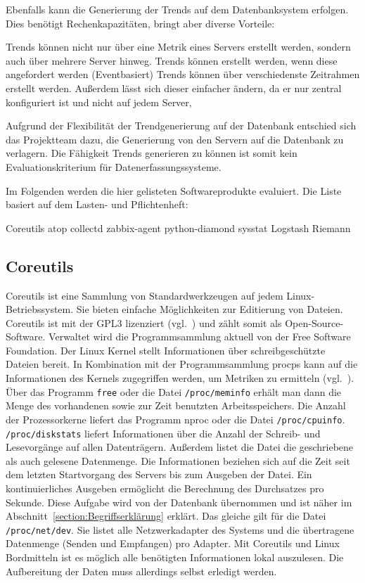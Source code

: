 Ebenfalls kann die Generierung der Trends auf dem Datenbanksystem erfolgen.
Dies benötigt Rechenkapazitäten, bringt aber diverse Vorteile:

\begin{outline}
  \1 Trends können nicht nur über eine Metrik eines Servers erstellt werden,
  sondern auch über mehrere Server hinweg.
  \1 Trends können erstellt werden, wenn diese angefordert werden
  (Eventbasiert)
  \1 Trends können über verschiedenste Zeitrahmen erstellt werden. Außerdem
  lässt sich dieser einfacher ändern, da er nur zentral konfiguriert ist und
  nicht auf jedem Server,
\end{outline}

Aufgrund der Flexibilität der Trendgenerierung auf der Datenbank entschied sich
das Projektteam dazu, die Generierung von den Servern auf die Datenbank zu
verlagern. Die Fähigkeit Trends generieren zu können ist somit kein
Evaluationskriterium für Datenerfassungssysteme.

Im Folgenden werden die hier gelisteten Softwareprodukte evaluiert. Die Liste
basiert auf dem Lasten- und Pflichtenheft:

\begin{outline}
  \1 Coreutils
  \1 atop
  \1 collectd
  \1 zabbix-agent
  \1 python-diamond
  \1 sysstat
  \1 Logstash
  \1 Riemann
\end{outline}
\tm%

\subsection{Coreutils}
Coreutils ist eine Sammlung von Standardwerkzeugen auf jedem
Linux-Betriebssystem. Sie bieten einfache Möglichkeiten zur Editierung von
Dateien. Coreutils ist mit der GPL3 lizenziert (vgl.~\cite{coreutils}) und
zählt somit als Open-Source-Software. Verwaltet wird die Programmsammlung
aktuell von der Free Software Foundation. Der Linux Kernel stellt Informationen
über schreibgeschützte Dateien bereit. In Kombination mit der Programmsammlung
procps kann auf die Informationen des Kernels zugegriffen werden, um Metriken
zu ermitteln (vgl.~\cite{procps}). Über das Programm \texttt{free} oder die
Datei \texttt{/proc/meminfo} erhält man dann die Menge des vorhandenen sowie
zur Zeit benutzten Arbeitsspeichers. Die Anzahl der Prozessorkerne liefert das
Programm nproc oder die Datei \texttt{/proc/cpuinfo}. \texttt{/proc/diskstats}
liefert Informationen über die Anzahl der Schreib- und Lesevorgänge auf allen
Datenträgern. Außerdem listet die Datei die geschriebene als auch gelesene
Datenmenge. Die Informationen beziehen sich auf die Zeit seit dem letzten
Startvorgang des Servers bis zum Ausgeben der Datei. Ein kontinuierliches
Ausgeben ermöglicht die Berechnung des Durchsatzes pro Sekunde. Diese Aufgabe
wird von der Datenbank übernommen und ist näher im
Abschnitt~\ref{section:Begriffserklärung} erklärt. Das gleiche gilt für die
Datei \texttt{/proc/net/dev}. Sie listet alle Netzwerkadapter des Systems und
die übertragene Datenmenge (Senden und Empfangen) pro Adapter. Mit Coreutils
und Linux Bordmitteln ist es möglich alle benötigten Informationen lokal
auszulesen. Die Aufbereitung der Daten muss allerdings selbst erledigt werden.


